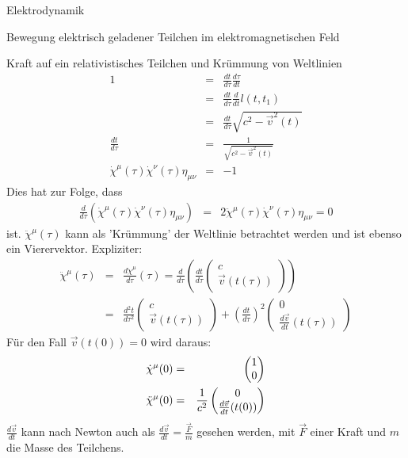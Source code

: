 \begin{chapter}{\titlestr}
\begin{section}{Elektrodynamik}
\begin{subsection}{Bewegung elektrisch geladener Teilchen im elektromagnetischen Feld}
\begin{subsubsection}{Kraft auf ein relativistisches Teilchen und Krümmung von Weltlinien}
\begin{eqnarray*}
1 &=& \frac{dt}{d\tau}\frac{d\tau}{dt}\\
&=& \frac{dt}{d\tau}\frac{d}{dt}l(t,t_1)\\
&=& \frac{dt}{d\tau}\sqrt{c^2-\vec{v}^2(t)}\\
\frac{dt}{d\tau} &=& \frac{1}{\sqrt{c^2-\vec{v}^2(t)}}\\
\dot{\chi}^\mu(\tau)\dot{\chi}^\nu(\tau)\eta_{\mu\nu} &=& -1
\end{eqnarray*}
Dies hat zur Folge, dass
\begin{eqnarray}
\label{cuvatuure_orthogonality}
\frac{d}{d\tau}\left(\dot{\chi}^\mu(\tau)\dot{\chi}^\nu(\tau)\eta_{\mu\nu}\right) &=& 2\ddot{\chi}^\mu(\tau)\dot{\chi}^\nu(\tau)\eta_{\mu\nu}  = 0
\end{eqnarray}
ist. $\ddot{\chi}^\mu(\tau)$ kann als 'Krümmung' der Weltlinie betrachtet werden und ist ebenso ein Vierervektor.
Expliziter:
\begin{eqnarray*}
\ddot{\chi}^\mu(\tau) &=& \frac{d\dot{\chi}^\mu}{d\tau}(\tau)=\frac{d}{d\tau}\left(\frac{dt}{d\tau}\begin{pmatrix}
c\\
\vec{v}(t(\tau))
\end{pmatrix}\right)\\
&=&\frac{d^2t}{d\tau^2}\begin{pmatrix}
c\\
\vec{v}(t(\tau))
\end{pmatrix}
+\left(\frac{dt}{d\tau}\right)^2\begin{pmatrix}
0\\
\frac{d\vec{v}}{dt}(t(\tau))
\end{pmatrix}
\end{eqnarray*}
Für den Fall $\vec{v}(t(0))=0$ wird daraus:
\begin{eqnarray}
\label{particle_curvature_at_rest}
\dot{\chi}^\mu(0) &=& \begin{pmatrix}
1\\
0
\end{pmatrix}\cr
\ddot{\chi}^\mu(0) &=& 
\frac{1}{c^2}\begin{pmatrix}
0\\
\frac{d\vec{v}}{dt}(t(0))
\end{pmatrix}
\end{eqnarray}
$\frac{d\vec{v}}{dt}$ kann nach Newton auch als $\frac{d\vec{v}}{dt}=\frac{\vec{F}}{m}$ gesehen werden, mit $\vec{F}$ einer Kraft und $m$ die Masse des Teilchens.
\end{subsubsection}


\end{subsection}
\end{section}
\end{chapter}

